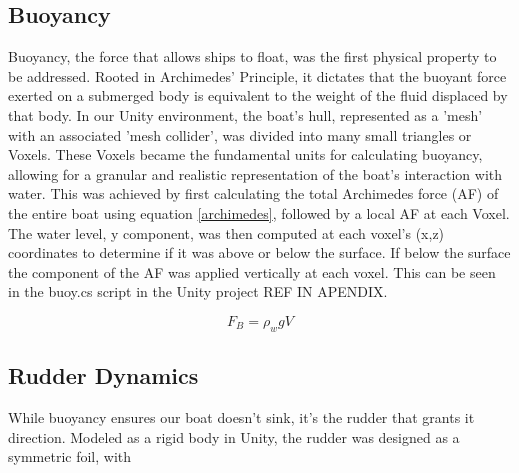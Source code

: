 \subsection{Buoyancy}
Buoyancy, the force that allows ships to float, was the first physical property to be addressed. Rooted in Archimedes' Principle, it dictates that the buoyant force exerted on a submerged body is equivalent to the weight of the fluid displaced by that body. In our Unity environment, the boat's hull, represented as a 'mesh' with an associated 'mesh collider', was divided into many small triangles or Voxels. These Voxels became the fundamental units for calculating buoyancy, allowing for a granular and realistic representation of the boat's interaction with water. This was achieved by first calculating the total Archimedes force (AF) of the entire boat using equation \ref{archimedes}, followed by a local AF at each Voxel. The water level, y component, was then computed at each voxel's (x,z) coordinates to determine if it was above or below the surface. If below the surface the component of the AF was applied vertically at each voxel. This can be seen in the buoy.cs script in the Unity project REF IN APENDIX.

\begin{equation}
    F_B = \rho_{w}gV
    \label{archimedes}
\end{equation}


\subsection{Rudder Dynamics}
While buoyancy ensures our boat doesn't sink, it's the rudder that grants it direction. Modeled as a rigid body in Unity, the rudder was designed as a symmetric foil, with




